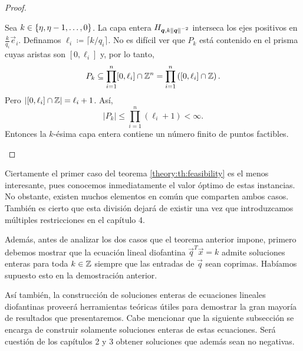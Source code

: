 \begin{proof}
\begin{enumerate}
			Sea $k \in \lbrace \eta, \eta - 1, \ldots, 0 \rbrace$. La capa entera $H_{\boldsymbol{q}, k\left\lVert \boldsymbol{q} \right\rVert^{-2}}$
			interseca los ejes positivos en $\frac{k}{q_i}\vec{e}_i$.
			Definamos $\ell_i \coloneq \lceil k/q_i \rceil$. No es difícil ver que $P_k$ está
			contenido en el prisma cuyas aristas son $[0, \ell_i]$ y, por lo tanto,
			\begin{equation*}
				P_k \subseteq \prod_{i = 1}^{n} [0, \ell_i] \cap \mathbb{Z}^n = \prod_{i = 1}^{n}
				\left( [0, \ell_i] \cap \mathbb{Z} \right).
			\end{equation*}
			Pero $\left| [0, \ell_i] \cap \mathbb{Z} \right| = \ell_i + 1$. Así,
			\begin{equation*}
				|P_k| \leq \prod_{i = 1}^{n} (\ell_i + 1) < \infty.
			\end{equation*}
			Entonces la $k$-ésima capa entera contiene un número finito de puntos factibles.
	\end{enumerate}
\end{proof}


Ciertamente el primer caso del teorema \ref{theory:th:feasibility} es el menos interesante, pues
conocemos inmediatamente el valor óptimo de estas instancias. No obstante, existen muchos elementos
en común que comparten ambos casos. También es cierto que esta división dejará de existir una vez
que introduzcamos múltiples restricciones en el capítulo 4.

Además, antes de analizar los dos casos que el teorema anterior impone, primero debemos mostrar que la
ecuación lineal diofantina $\vec{q}^T\vec{x} = k$ admite soluciones enteras para toda $k \in \mathbb{Z}$
siempre que las entradas de $\vec{q}$ sean coprimas. Habíamos supuesto esto en la demostración
anterior.

Así también, la construcción de soluciones enteras de ecuaciones lineales diofantinas proveerá
herramientas teóricas útiles para demostrar la gran mayoría de resultados que presentaremos. Cabe
mencionar que la siguiente subsección se encarga de construir solamente soluciones enteras de estas
ecuaciones. Será cuestión de los capítulos 2 y 3 obtener soluciones que además sean no negativas.

